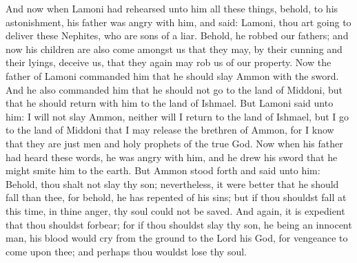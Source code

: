 And now when Lamoni had rehearsed unto him all these things, behold, to his astonishment, his father was angry with him, and said: Lamoni, thou art going to deliver these Nephites, who are sons of a liar. Behold, he robbed our fathers; and now his children are also come amongst us that they may, by their cunning and their lyings, deceive us, that they again may rob us of our property.
\bverse \iffalse Now the father of Lamoni commanded him that he should slay Ammon with the sword. And he also commanded him that he should not go to the land of Middoni, but that he should return with him to the land of Ishmael. \fi
Now the father of Lamoni commanded him that he should slay Ammon with the sword. And he also commanded him that he should not go to the land of Middoni, but that he should return with him to the land of Ishmael.
\bverse \iffalse But Lamoni said unto him: I will not slay Ammon, neither will I return to the land of Ishmael, but I go to the land of Middoni that I may release the brethren of Ammon, for I know that they are just men and holy prophets of the true God. \fi
But Lamoni said unto him: I will not slay Ammon, neither will I return to the land of Ishmael, but I go to the land of Middoni that I may release the brethren of Ammon, for I know that they are just men and holy prophets of the true God.
\bverse \iffalse Now when his father had heard these words, he was angry with him, and he drew his sword that he might smite him to the earth. \fi
Now when his father had heard these words, he was angry with him, and he drew his sword that he might smite him to the earth.
\bverse \iffalse But Ammon stood forth and said unto him: Behold, thou shalt not slay thy son; nevertheless, it were better that he should fall than thee, for behold, he has repented of his sins; but if thou shouldst fall at this time, in thine anger, thy soul could not be saved. \fi
But Ammon stood forth and said unto him: Behold, thou shalt not slay thy son; nevertheless, it were better that he should fall than thee, for behold, he has repented of his sins; but if thou shouldst fall at this time, in thine anger, thy soul could not be saved.
\bverse \iffalse And again, it is expedient that thou shouldst forbear; for if thou shouldst slay thy son, he being an innocent man, his blood would cry from the ground to the Lord his God, for vengeance to come upon thee; and perhaps thou wouldst lose thy soul. \fi
And again, it is expedient that thou shouldst forbear; for if thou shouldst slay thy son, he being an innocent man, his blood would cry from the ground to the Lord his God, for vengeance to come upon thee; and perhaps thou wouldst lose thy soul.
